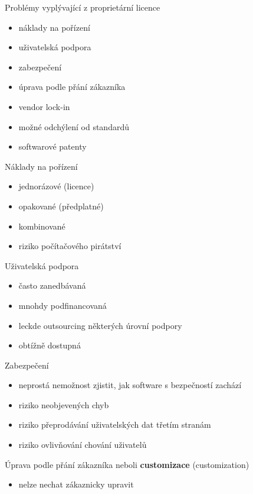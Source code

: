 \documentclass[11pt]{beamer}
\begin{document}
\begin{frame}{Problémy vyplývající z proprietární licence}
	\begin{itemize}
		\item náklady na pořízení
		\item uživatelská podpora
		\item zabezpečení
		\item úprava podle přání zákazníka
		\item vendor lock-in
		\item možné odchýlení od standardů
		\item softwarové patenty
	\end{itemize}
\end{frame}

\begin{frame}{Náklady na pořízení}
	\begin{itemize}
		\item jednorázové (licence)
		\item opakované (předplatné)
		\item kombinované
		\item riziko počítačového pirátství
	\end{itemize}
\end{frame}

\begin{frame}{Uživatelská podpora}
	\begin{itemize}
		\item často zanedbávaná
		\item mnohdy podfinancovaná
		\item leckde outsourcing některých úrovní podpory
		\item obtížně dostupná
	\end{itemize}
\end{frame}

\begin{frame}{Zabezpečení}
	\begin{itemize}
		\item neprostá nemožnost zjistit, jak software s bezpečností zachází
		\item riziko neobjevených chyb
		\item riziko přeprodávání uživatelských dat třetím stranám
		\item riziko ovlivňování chování uživatelů
	\end{itemize}
\end{frame}

\begin{frame}{Úprava podle přání zákazníka}
	neboli \textbf{customizace} (customization)
	\begin{itemize}
		\item nelze nechat zákaznicky upravit
	\end{itemize}
\end{frame}
\end{document}
